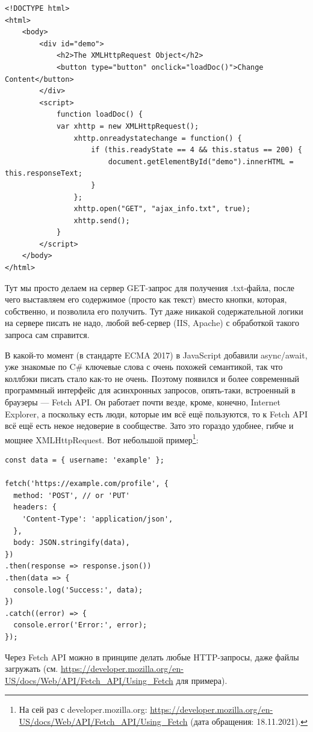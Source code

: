 \documentclass{../../text-style}
\begin{document}
\begin{verbatim}
<!DOCTYPE html>
<html>
    <body>
        <div id="demo">
            <h2>The XMLHttpRequest Object</h2>
            <button type="button" onclick="loadDoc()">Change Content</button>
        </div>
        <script>
            function loadDoc() {
            var xhttp = new XMLHttpRequest();
                xhttp.onreadystatechange = function() {
                    if (this.readyState == 4 && this.status == 200) {
                        document.getElementById("demo").innerHTML = this.responseText;
                    }
                };
                xhttp.open("GET", "ajax_info.txt", true);
                xhttp.send();
            }
        </script>
    </body>
</html>
\end{verbatim}

Тут мы просто делаем на сервер GET-запрос для получения .txt-файла, после чего выставляем его содержимое (просто как текст) вместо кнопки, которая, собственно, и позволила его получить. Тут даже никакой содержательной логики на сервере писать не надо, любой веб-сервер (IIS, Apache) с обработкой такого запроса сам справится.

В какой-то момент (в стандарте ECMA 2017) в JavaScript добавили async/await, уже знакомые по C\# ключевые слова с очень похожей семантикой, так что коллбэки писать стало как-то не очень. Поэтому появился и более современный программный интерфейс для асинхронных запросов, опять-таки, встроенный в браузеры --- Fetch API. Он работает почти везде, кроме, конечно, Internet Explorer, а поскольку есть люди, которые им всё ещё пользуются, то к Fetch API всё ещё есть некое недоверие в сообществе. Зато это гораздо удобнее, гибче и мощнее XMLHttpRequest. Вот небольшой пример\footnote{На сей раз с developer.mozilla.org: \url{https://developer.mozilla.org/en-US/docs/Web/API/Fetch_API/Using_Fetch} (дата обращения: 18.11.2021).}:

\begin{verbatim}
const data = { username: 'example' };

fetch('https://example.com/profile', {
  method: 'POST', // or 'PUT'
  headers: {
    'Content-Type': 'application/json',
  },
  body: JSON.stringify(data),
})
.then(response => response.json())
.then(data => {
  console.log('Success:', data);
})
.catch((error) => {
  console.error('Error:', error);
});
\end{verbatim}

Через Fetch API можно в принципе делать любые HTTP-запросы, даже файлы загружать (см. \url{https://developer.mozilla.org/en-US/docs/Web/API/Fetch_API/Using_Fetch} для примера).
\end{document}
